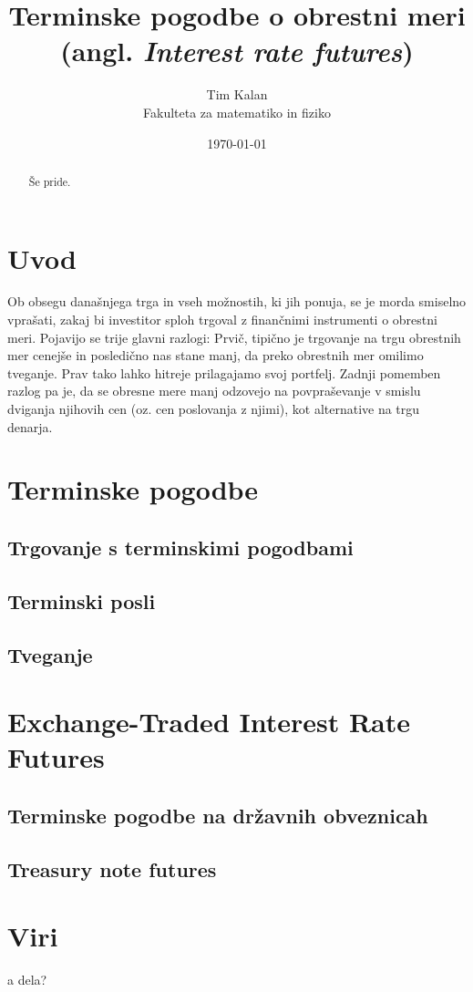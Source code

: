 \documentclass[a4paper, 12pt]{article}
\author{Tim Kalan \\ Fakulteta za matematiko in fiziko}
\title{
    Terminske pogodbe o obrestni meri \\ 
    \large (angl. \textit{Interest rate futures})}
\date{\today} %
\begin{document}
\maketitle
\pagebreak
\tableofcontents
\pagebreak

\begin{abstract}
    Še pride.
\end{abstract}

\section{Uvod}
Ob obsegu današnjega trga in vseh možnostih, ki jih ponuja, se je morda smiselno vprašati,
zakaj bi investitor sploh trgoval z finančnimi instrumenti o obrestni meri. Pojavijo se trije
glavni razlogi: Prvič, tipično je trgovanje na trgu obrestnih mer cenejše in posledično nas 
stane manj, da preko obrestnih mer omilimo tveganje. Prav tako lahko hitreje prilagajamo svoj 
portfelj. Zadnji pomemben razlog pa je, da se obresne mere manj odzovejo na povpraševanje v 
smislu dviganja njihovih cen (oz. cen poslovanja z njimi), kot alternative na trgu denarja.

\section{Terminske pogodbe}
\subsection{Trgovanje s terminskimi pogodbami}
\subsection{Terminski posli}
\subsection{Tveganje}

\section{Exchange-Traded Interest Rate Futures}
\subsection{Terminske pogodbe na državnih obveznicah}
\subsection{Treasury note futures}

\section{Viri}
\begin{description}
    \item a dela?
\end{description}
\end{document}
